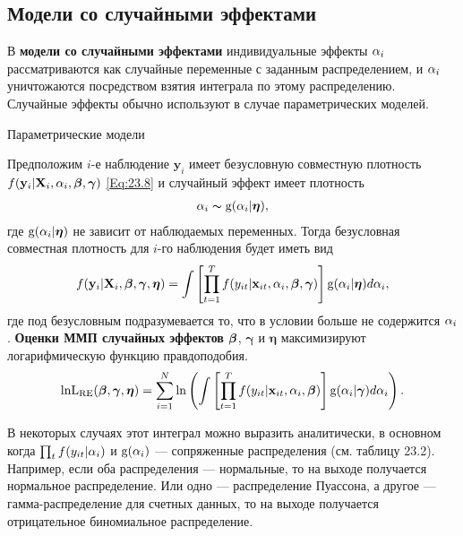 \subsection{Модели со случайными эффектами}

В \textbf{модели со случайными эффектами} индивидуальные эффекты $\alpha_i$ рассматриваются как случайные переменные с заданным распределением, и $\alpha_i$ уничтожаются посредством взятия интеграла по этому распределению. Случайные эффекты обычно используют в случае параметрических моделей.

{\centering Параметрические модели \\}

Предположим $i$-е наблюдение $\mathbf{y}_i$ имеет безусловную совместную плотность $f(\mathbf{y}_i|\mathbf{X}_i, \alpha_i, \bm{\beta}, \bm\gamma)$ \ref{Eq:23.8} и случайный эффект имеет плотность
\begin{align}
\alpha_i \thicksim \mathrm g(\alpha_i|\bm\eta),
\label{Eq:23.17}
\end{align}
где $\mathrm g(\alpha_i|\bm\eta)$ не зависит от наблюдаемых переменных. Тогда безусловная совместная плотность для $i$-го наблюдения будет иметь вид
\begin{align}
f(\mathbf{y}_i|\mathbf{X}_i, \bm{\beta}, \bm\gamma, \bm\eta) = \int \left[ \prod^T_{t=1} f(y_{it} | \mathbf{x}_{it}, \alpha_i, \bm{\beta}, \bm\gamma) \right] \mathrm g(\alpha_i|\bm\eta)d \alpha_i,
\label{Eq:23.18}
\end{align}
где под безусловным подразумевается то, что в условии больше не содержится $\alpha_i$. \textbf{Оценки ММП случайных эффектов} $\bm{\beta}$, $\bm\gamma$ и $\bm\eta$ максимизируют логарифмическую функцию правдоподобия.
\begin{align}
\mathrm{ln L}_{\mathrm{RE}}(\bm{\beta}, \bm\gamma, \bm\eta)=\sum^N_{i=1} \mathrm{ln}\left( \int \left[ \prod^T_{t=1} f(y_{it}|\mathbf{x}_{it}, \alpha_i, \bm{\beta}) \right] \mathrm g(\alpha_i| \bm\gamma) d \alpha_i \right).
\label{Eq:23.19}
\end{align}

В некоторых случаях этот интеграл можно выразить аналитически, в основном когда $\prod_t f(y_{it}|\alpha_i)$ и $\mathrm g(\alpha_i)$ --- сопряженные распределения (см. таблицу 23.2). Например, если оба распределения --- нормальные, то на выходе получается нормальное распределение. Или одно --- распределение Пуассона, а другое --- гамма-распределение для счетных данных, то на выходе получается отрицательное биномиальное распределение.

